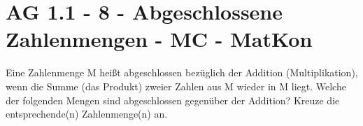 \section{AG 1.1 - 8 - Abgeschlossene Zahlenmengen - MC - MatKon}

\begin{beispiel}[AG 1.1]{1} %
				Eine Zahlenmenge M heißt abgeschlossen bezüglich der Addition (Multiplikation), wenn die Summe (das Produkt) zweier Zahlen aus M wieder in M liegt. Welche der folgenden Mengen sind abgeschlossen gegenüber der Addition? Kreuze die entsprechende(n) Zahlenmenge(n) an.

\end{beispiel}